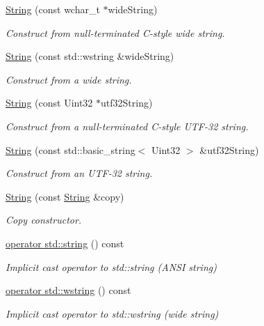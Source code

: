 \begin{DoxyCompactItemize}
\hyperlink{classsf_1_1_string_a5742d0a9b0c754f711820c2b5c40fa55}{String} (const wchar\+\_\+t $\ast$wide\+String)
\begin{DoxyCompactList}\small\item\em Construct from null-\/terminated C-\/style wide string. \end{DoxyCompactList}\item 
\hyperlink{classsf_1_1_string_a5e38151340af4f9a5f74ad24c0664074}{String} (const std\+::wstring \&wide\+String)
\begin{DoxyCompactList}\small\item\em Construct from a wide string. \end{DoxyCompactList}\item 
\hyperlink{classsf_1_1_string_aea3629adf19f9fe713d4946f6c75b214}{String} (const Uint32 $\ast$utf32\+String)
\begin{DoxyCompactList}\small\item\em Construct from a null-\/terminated C-\/style U\+T\+F-\/32 string. \end{DoxyCompactList}\item 
\hyperlink{classsf_1_1_string_a6eee86dbe75d16bbcc26e97416c2e1ca}{String} (const std\+::basic\+\_\+string$<$ Uint32 $>$ \&utf32\+String)
\begin{DoxyCompactList}\small\item\em Construct from an U\+T\+F-\/32 string. \end{DoxyCompactList}\item 
\hyperlink{classsf_1_1_string_af862594d3c4070d8ddbf08cf8dce4f59}{String} (const \hyperlink{classsf_1_1_string}{String} \&copy)
\begin{DoxyCompactList}\small\item\em Copy constructor. \end{DoxyCompactList}\item 
\hyperlink{classsf_1_1_string_a3664f92c3b488bf9f60f6b8eafe1844d}{operator std\+::string} () const 
\begin{DoxyCompactList}\small\item\em Implicit cast operator to std\+::string (A\+N\+S\+I string) \end{DoxyCompactList}\item 
\hyperlink{classsf_1_1_string_a20d50d45020d1dbe1779dda69ee83732}{operator std\+::wstring} () const 
\begin{DoxyCompactList}\small\item\em Implicit cast operator to std\+::wstring (wide string) \end{DoxyCompactList}\item 

\end{DoxyCompactItemize}
